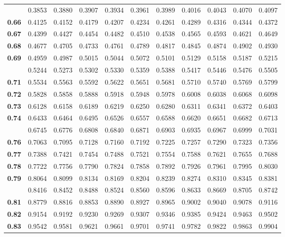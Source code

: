 \documentclass[]{article}
\begin{document}
\begin{longtable}{>{\bfseries}r|rrrrrrrrrr}
\addlinespace
0.65 & 0.3853 & 0.3880 & 0.3907 & 0.3934 & 0.3961 & 0.3989 & 0.4016 & 0.4043 & 0.4070 & 0.4097\\
0.66 & 0.4125 & 0.4152 & 0.4179 & 0.4207 & 0.4234 & 0.4261 & 0.4289 & 0.4316 & 0.4344 & 0.4372\\
0.67 & 0.4399 & 0.4427 & 0.4454 & 0.4482 & 0.4510 & 0.4538 & 0.4565 & 0.4593 & 0.4621 & 0.4649\\
0.68 & 0.4677 & 0.4705 & 0.4733 & 0.4761 & 0.4789 & 0.4817 & 0.4845 & 0.4874 & 0.4902 & 0.4930\\
0.69 & 0.4959 & 0.4987 & 0.5015 & 0.5044 & 0.5072 & 0.5101 & 0.5129 & 0.5158 & 0.5187 & 0.5215\\
\addlinespace
0.70 & 0.5244 & 0.5273 & 0.5302 & 0.5330 & 0.5359 & 0.5388 & 0.5417 & 0.5446 & 0.5476 & 0.5505\\
0.71 & 0.5534 & 0.5563 & 0.5592 & 0.5622 & 0.5651 & 0.5681 & 0.5710 & 0.5740 & 0.5769 & 0.5799\\
0.72 & 0.5828 & 0.5858 & 0.5888 & 0.5918 & 0.5948 & 0.5978 & 0.6008 & 0.6038 & 0.6068 & 0.6098\\
0.73 & 0.6128 & 0.6158 & 0.6189 & 0.6219 & 0.6250 & 0.6280 & 0.6311 & 0.6341 & 0.6372 & 0.6403\\
0.74 & 0.6433 & 0.6464 & 0.6495 & 0.6526 & 0.6557 & 0.6588 & 0.6620 & 0.6651 & 0.6682 & 0.6713\\
\addlinespace
0.75 & 0.6745 & 0.6776 & 0.6808 & 0.6840 & 0.6871 & 0.6903 & 0.6935 & 0.6967 & 0.6999 & 0.7031\\
0.76 & 0.7063 & 0.7095 & 0.7128 & 0.7160 & 0.7192 & 0.7225 & 0.7257 & 0.7290 & 0.7323 & 0.7356\\
0.77 & 0.7388 & 0.7421 & 0.7454 & 0.7488 & 0.7521 & 0.7554 & 0.7588 & 0.7621 & 0.7655 & 0.7688\\
0.78 & 0.7722 & 0.7756 & 0.7790 & 0.7824 & 0.7858 & 0.7892 & 0.7926 & 0.7961 & 0.7995 & 0.8030\\
0.79 & 0.8064 & 0.8099 & 0.8134 & 0.8169 & 0.8204 & 0.8239 & 0.8274 & 0.8310 & 0.8345 & 0.8381\\
\addlinespace
0.80 & 0.8416 & 0.8452 & 0.8488 & 0.8524 & 0.8560 & 0.8596 & 0.8633 & 0.8669 & 0.8705 & 0.8742\\
0.81 & 0.8779 & 0.8816 & 0.8853 & 0.8890 & 0.8927 & 0.8965 & 0.9002 & 0.9040 & 0.9078 & 0.9116\\
0.82 & 0.9154 & 0.9192 & 0.9230 & 0.9269 & 0.9307 & 0.9346 & 0.9385 & 0.9424 & 0.9463 & 0.9502\\
0.83 & 0.9542 & 0.9581 & 0.9621 & 0.9661 & 0.9701 & 0.9741 & 0.9782 & 0.9822 & 0.9863 & 0.9904\\

\end{longtable}
\end{document}
